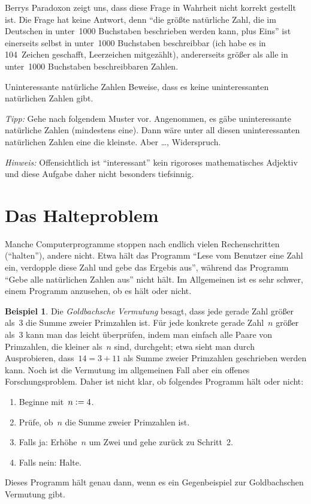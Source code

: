 \documentclass[twoside]{../zirkelblatt1415}
\theoremstyle{definition}
\newtheorem{bsp}[defn]{Beispiel}
\theoremstyle{plain}
\theoremstyle{remark}
\newenvironment{listing}{
  \renewcommand*\theenumi{\arabic{enumi}}
  \renewcommand{\labelenumi}{\theenumi.}
  \begin{enumerate}\itemsep0em}{\end{enumerate}}
\newcommand{\defeq}{\vcentcolon=}
\begin{document}
Berrys Paradoxon zeigt uns, dass diese Frage in Wahrheit nicht korrekt gestellt
ist. Die Frage hat keine Antwort, denn "`die größte natürliche Zahl, die im
Deutschen in unter~1000 Buchstaben beschrieben werden kann, plus Eins"' ist
einerseits selbst in unter~1000 Buchstaben beschreibbar (ich habe es in
104~Zeichen geschafft, Leerzeichen mitgezählt), andererseits größer als alle in
unter~1000 Buchstaben beschreibbaren Zahlen.

\begin{aufgabe}{Uninteressante natürliche Zahlen}
Beweise, dass es keine uninteressanten natürlichen Zahlen gibt.

\emph{Tipp:} Gehe nach folgendem Muster vor. Angenommen, es gäbe uninteressante
natürliche Zahlen (mindestens eine). Dann wäre unter all diesen uninteressanten
natürlichen Zahlen eine die kleinste. Aber \ldots, Widerspruch.

\emph{Hinweis:} Offensichtlich ist "`interessant"' kein rigoroses
mathematisches Adjektiv und diese Aufgabe daher nicht besonders tiefsinnig.
\end{aufgabe}


\section{Das Halteproblem}

Manche Computerprogramme stoppen nach endlich vielen Rechenschritten
("`halten"'), andere nicht. Etwa hält das Programm "`Lese vom Benutzer eine
Zahl ein, verdopple diese Zahl und gebe das Ergebis aus"', während das Programm
"`Gebe alle natürlichen Zahlen aus"' nicht hält. Im Allgemeinen ist es sehr
schwer, einem Programm anzusehen, ob es hält oder nicht.

\begin{bsp}\label{bsp:unklares-programm1}Die \emph{Goldbachsche Vermutung}
besagt, dass jede gerade Zahl
größer als~3 die Summe zweier Primzahlen ist. Für jede
konkrete gerade Zahl~$n$ größer als~3 kann man das leicht überprüfen, indem man
einfach alle Paare von Primzahlen, die kleiner als~$n$ sind, durchgeht; etwa
sieht man durch Ausprobieren, dass~$14 = 3 + 11$ als Summe zweier Primzahlen
geschrieben werden kann. Noch ist die Vermutung im allgemeinen Fall aber ein
offenes Forschungsproblem. Daher ist nicht klar, ob folgendes Programm hält
oder nicht:
\begin{listing}
\item[1.] Beginne mit~$n \defeq 4$.
\item[2.] Prüfe, ob~$n$ die Summe zweier Primzahlen ist.
\item[3.] Falls ja: Erhöhe~$n$ um Zwei und gehe zurück zu Schritt~2.
\item[4.] Falls nein: Halte.
\end{listing}
Dieses Programm hält genau dann, wenn es ein Gegenbeispiel zur Goldbachschen
Vermutung gibt.
\end{bsp}
\end{document}
